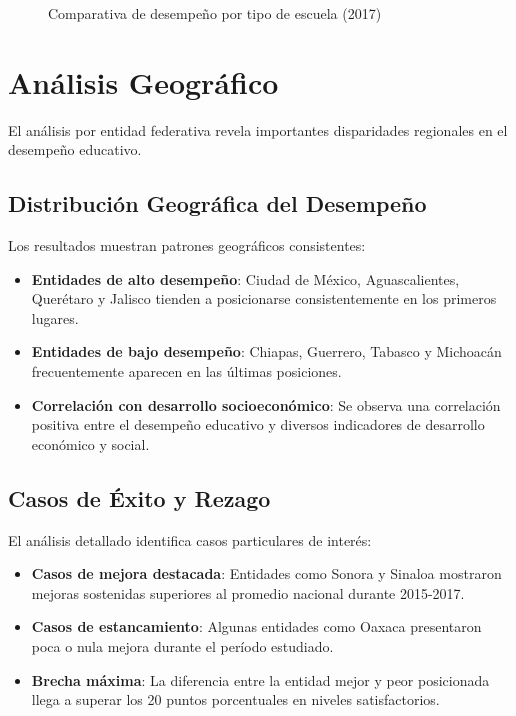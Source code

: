 \begin{figure}[h]
    \centering
    \caption{Comparativa de desempeño por tipo de escuela (2017)}
    \label{fig:comparativa_tipos}
\end{figure}

\section{Análisis Geográfico}
El análisis por entidad federativa revela importantes disparidades regionales en el desempeño educativo.

\subsection{Distribución Geográfica del Desempeño}
Los resultados muestran patrones geográficos consistentes:

\begin{itemize}
    \item \textbf{Entidades de alto desempeño}: Ciudad de México, Aguascalientes, Querétaro y Jalisco tienden a posicionarse consistentemente en los primeros lugares.
    
    \item \textbf{Entidades de bajo desempeño}: Chiapas, Guerrero, Tabasco y Michoacán frecuentemente aparecen en las últimas posiciones.
    
    \item \textbf{Correlación con desarrollo socioeconómico}: Se observa una correlación positiva entre el desempeño educativo y diversos indicadores de desarrollo económico y social.
\end{itemize}

\subsection{Casos de Éxito y Rezago}
El análisis detallado identifica casos particulares de interés:

\begin{itemize}
    \item \textbf{Casos de mejora destacada}: Entidades como Sonora y Sinaloa mostraron mejoras sostenidas superiores al promedio nacional durante 2015-2017.
    
    \item \textbf{Casos de estancamiento}: Algunas entidades como Oaxaca presentaron poca o nula mejora durante el período estudiado.
    
    \item \textbf{Brecha máxima}: La diferencia entre la entidad mejor y peor posicionada llega a superar los 20 puntos porcentuales en niveles satisfactorios.
\end{itemize}

